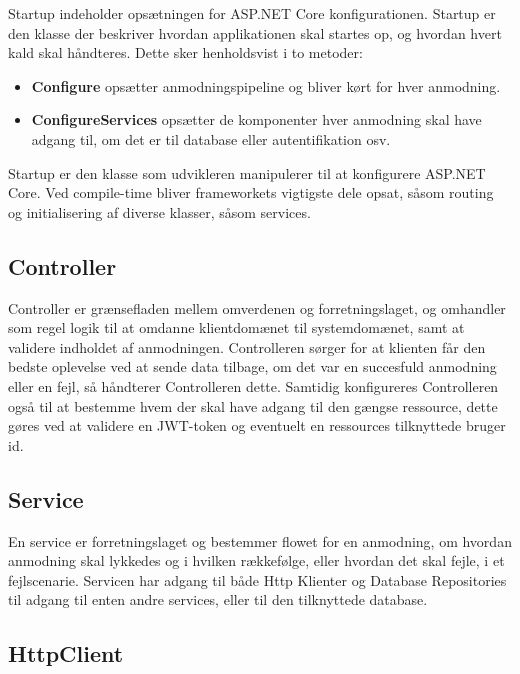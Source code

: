Startup indeholder opsætningen for ASP.NET Core konfigurationen. Startup er den klasse der beskriver hvordan applikationen skal startes op, og hvordan hvert kald skal håndteres. Dette sker henholdsvist i to metoder:

\begin{itemize}
  \item \textbf{Configure}  opsætter anmodningspipeline og bliver kørt for hver anmodning.
  \item \textbf{ConfigureServices} opsætter de komponenter hver anmodning skal have adgang til, om det er til database eller autentifikation osv.
\end{itemize}

Startup er den klasse som udvikleren manipulerer til at konfigurere ASP.NET Core. Ved compile-time bliver frameworkets vigtigste dele opsat, såsom routing og initialisering af diverse klasser, såsom services.

\subsection{Controller}

Controller er grænsefladen mellem omverdenen og forretningslaget, og omhandler som regel logik til at omdanne klientdomænet til systemdomænet, samt at validere indholdet af anmodningen. Controlleren sørger for at klienten får den bedste oplevelse ved at sende data tilbage, om det var en succesfuld anmodning eller en fejl, så håndterer Controlleren dette. Samtidig konfigureres Controlleren også til at bestemme hvem der skal have adgang til den gængse ressource, dette gøres ved at validere en JWT-token og eventuelt en ressources tilknyttede bruger id.

\subsection{Service}

En service er forretningslaget og bestemmer flowet for en anmodning, om hvordan anmodning skal lykkedes og i hvilken rækkefølge, eller hvordan det skal fejle, i et fejlscenarie. Servicen har adgang til både Http Klienter og Database Repositories til adgang til enten andre services, eller til den tilknyttede database.

\subsection{HttpClient}

